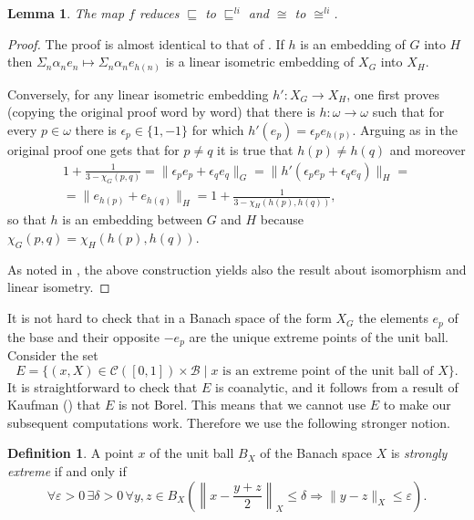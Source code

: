 \documentclass{amsart}
\newtheorem{lemma}[theorem]{Lemma}
\theoremstyle{definition}
\newtheorem{defin}[theorem]{Definition}
\theoremstyle{remark}
\begin{document}
\begin{lemma} \label{lemmareduction}
The map $f$ reduces $\sqsubseteq$ to $\sqsubseteq^{li}$ and $\cong$ to
$\cong^{li}$.
\end{lemma}

\begin{proof}
The proof is almost identical to that of \cite[Theorem
4.6]{louros}. If $h$ is an embedding of $G$ into $H$ then $\Sigma_n
\alpha_n e_n \mapsto \Sigma_n \alpha_n e_{h(n)}$ is a linear isometric
embedding of  $X_G$ into $X_H$.

Conversely, for any linear isometric embedding $h' \colon X_G \to
X_H$, one first proves (copying the original proof word by word) that
there is $h \colon \omega \to \omega$ such
that for every $p \in \omega$ there is $\epsilon_p \in \{ 1, -1\}$ for
which $h'(e_p) = \epsilon_p e_{h(p)}$. Arguing as in the original
proof one gets that for $p \neq q$ it is true that $h(p) \neq h(q)$
and moreover
\begin{multline*}
  1 + \frac{1}{3 - \chi_G(p,q)} = \| \epsilon_p e_p + \epsilon_q e_q
\|_G = \| h'(\epsilon_p e_p + \epsilon_q e_q)\|_H = \\
 = \| e_{h(p)} +
e_{h(q)} \|_H = 1 + \frac{1}{3 - \chi_H(h(p),h(q))},
\end{multline*}
so that $h$ is an embedding between $G$ and $H$ because $\chi_G(p,q) =
\chi_H(h(p),h(q))$.

As noted in \cite[Remark 4.7]{louros}, the above construction yields
also the result about isomorphism and linear isometry.
\end{proof}

It is not hard to check that in a Banach space of the form $X_G$ the
elements $e_p$ of the base and their opposite $-e_p$ are the unique
extreme points of the unit ball. Consider the set
\[
E =\{(x,X) \in \mathcal{C}([0,1]) \times \mathcal{B} \mid
x \text{ is an extreme point of the unit ball of } X\}.
\]
It is straightforward to check that $E$ is coanalytic, and it follows
from a result of Kaufman (\cite[Section III]{Kaufman}) that $E$ is not
Borel. This means that we cannot use $E$ to make our subsequent
computations work. Therefore we use the following stronger notion.

\begin{defin}
A point $x$ of the unit ball $B_X$ of the Banach space $X$ is
\emph{strongly extreme}  if and only if
\begin{equation} \label{eqse}
 \forall \varepsilon > 0\, \exists \delta > 0 \,\forall y,z \in B_X
 \left( \left\|
x - \frac{y+z}{2} \right\|_X \leq \delta {\Rightarrow} \| y-z \|_X \leq
\varepsilon \right).
\end{equation}
\end{defin}
\end{document}
